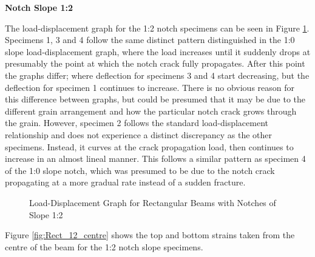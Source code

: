 \documentclass[11pt,a4paper]{article}
\numberwithin{equation}{subsection}
\begin{document}
\noindent
\textbf{Notch Slope 1:2}\par
\noindent
The load-displacement graph for the 1:2 notch specimens can be seen in Figure \ref{fig:Rect_12_def}. Specimens 1, 3 and 4 follow the same distinct pattern distinguished in the 1:0 slope load-displacement graph, where the load increases until it suddenly drops at presumably the point at which the notch crack fully propagates. After this point the graphs differ; where deflection for specimens 3 and 4 start decreasing, but the deflection for specimen 1 continues to increase. There is no obvious reason for this difference between graphs, but could be presumed that it may be due to the different grain arrangement and how the particular notch crack grows through the grain. However, specimen 2 follows the standard load-displacement relationship and does not experience a distinct discrepancy as the other specimens. Instead, it curves at the crack propagation load, then continues to increase in an almost lineal manner. This follows a similar pattern as specimen 4 of the 1:0 slope notch, which was presumed to be due to the notch crack propagating at a more gradual rate instead of a sudden fracture. 

\vspace*{\baselineskip}

\begin{figure}[h]
	\begin{center}
	\end{center}
	\caption{Load-Displacement Graph for Rectangular Beams with Notches of Slope 1:2}
	\label{fig:Rect_12_def}
\end{figure}

\noindent
Figure \ref{fig:Rect_12_centre} shows the top and bottom strains taken from the centre of the beam for the 1:2 notch slope specimens. 
\end{document}
